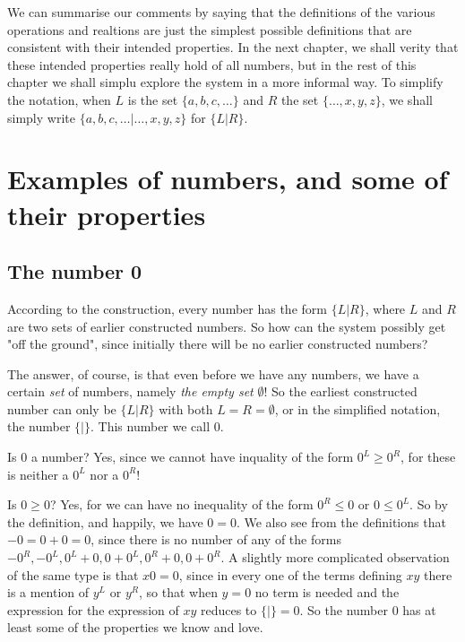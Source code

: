 \documentclass[10pt,a4paper]{book}
\begin{document}
We can summarise our comments by saying that the definitions of the various operations and realtions are just the simplest possible definitions that are consistent with their intended properties. In the next chapter, we shall verity that these intended properties really hold of all numbers, but in the rest of this chapter we shall simplu explore the system in a more informal way. To simplify the notation, when $ L $ is the set $ \{a, b, c, \dots \} $ and $ R $ the set $ \{ \dots, x,y,z \} $, we shall simply write $ \{ a, b, c, \dots | \dots, x, y, z \} $ for $ \{ L|R \} $.

\section{Examples of numbers, and some of their properties}
\subsection{The number 0}
According to the construction, every number has the form $ \{ L|R \} $, where $ L $ and $ R $ are two sets of earlier constructed numbers. So how can the system possibly get "off the ground", since initially there will be no earlier constructed numbers?

The answer, of course, is that even before we have any numbers, we have a certain \textit{set} of numbers, namely \textit{the empty set} $ \emptyset $! So the earliest constructed number can only be $ \{L|R\} $ with both $ L=R=\emptyset $, or in the simplified notation, the number $ \{|\} $. This number we call 0.

Is 0 a number? Yes, since we cannot have inquality of the form $ 0^L\ge 0^R $, for these is neither a $ 0^L $ nor a $ 0^R $!

Is $ 0\ge 0 $? Yes, for we can have no inequality of the form $ 0^R \le 0 $ or $ 0\le 0^L $. So by the definition, and happily, we have $ 0=0 $. We also see from the definitions that $ -0=0+0=0 $, since there is no number of any of the forms $ -0^R, -0^L, 0^L+0, 0+0^L, 0^R+0, 0+0^R $. A slightly more complicated observation of the same type is that $ x0=0 $, since in every one of the terms defining $ xy $ there is a mention of $ y^L $ or $ y^R $, so that when $ y=0 $ no term is needed and the expression for the expression of $ xy $ reduces to $ \{|\} =0 $. So the number 0 has at least some of the properties we know and love. 
\end{document}
